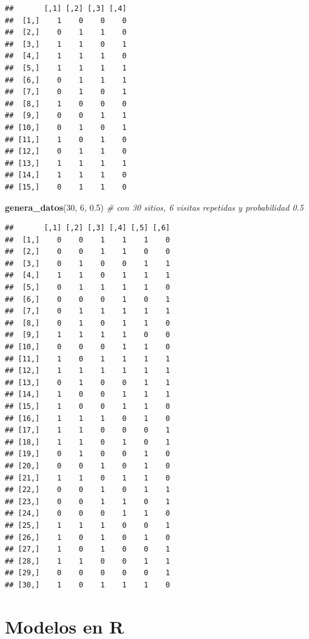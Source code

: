 \documentclass[
]{book}
\newenvironment{Shaded}{\begin{snugshade}}{\end{snugshade}}
\newcommand{\CommentTok}[1]{\textcolor[rgb]{0.56,0.35,0.01}{\textit{#1}}}
\newcommand{\DecValTok}[1]{\textcolor[rgb]{0.00,0.00,0.81}{#1}}
\newcommand{\FloatTok}[1]{\textcolor[rgb]{0.00,0.00,0.81}{#1}}
\newcommand{\KeywordTok}[1]{\textcolor[rgb]{0.13,0.29,0.53}{\textbf{#1}}}
\newcommand{\NormalTok}[1]{#1}
\begin{document}
\begin{verbatim}
##       [,1] [,2] [,3] [,4]
##  [1,]    1    0    0    0
##  [2,]    0    1    1    0
##  [3,]    1    1    0    1
##  [4,]    1    1    1    0
##  [5,]    1    1    1    1
##  [6,]    0    1    1    1
##  [7,]    0    1    0    1
##  [8,]    1    0    0    0
##  [9,]    0    0    1    1
## [10,]    0    1    0    1
## [11,]    1    0    1    0
## [12,]    0    1    1    0
## [13,]    1    1    1    1
## [14,]    1    1    1    0
## [15,]    0    1    1    0
\end{verbatim}

\begin{Shaded}
\begin{Highlighting}[]
\KeywordTok{genera_datos}\NormalTok{(}\DecValTok{30}\NormalTok{, }\DecValTok{6}\NormalTok{, }\FloatTok{0.5}\NormalTok{) }\CommentTok{# con 30 sitios, 6 visitas repetidas y probabilidad 0.5}
\end{Highlighting}
\end{Shaded}

\begin{verbatim}
##       [,1] [,2] [,3] [,4] [,5] [,6]
##  [1,]    0    0    1    1    1    0
##  [2,]    0    0    1    1    0    0
##  [3,]    0    1    0    0    1    1
##  [4,]    1    1    0    1    1    1
##  [5,]    0    1    1    1    1    0
##  [6,]    0    0    0    1    0    1
##  [7,]    0    1    1    1    1    1
##  [8,]    0    1    0    1    1    0
##  [9,]    1    1    1    1    0    0
## [10,]    0    0    0    1    1    0
## [11,]    1    0    1    1    1    1
## [12,]    1    1    1    1    1    1
## [13,]    0    1    0    0    1    1
## [14,]    1    0    0    1    1    1
## [15,]    1    0    0    1    1    0
## [16,]    1    1    1    0    1    0
## [17,]    1    1    0    0    0    1
## [18,]    1    1    0    1    0    1
## [19,]    0    1    0    0    1    0
## [20,]    0    0    1    0    1    0
## [21,]    1    1    0    1    1    0
## [22,]    0    0    1    0    1    1
## [23,]    0    0    1    1    0    1
## [24,]    0    0    0    1    1    0
## [25,]    1    1    1    0    0    1
## [26,]    1    0    1    0    1    0
## [27,]    1    0    1    0    0    1
## [28,]    1    1    0    0    1    1
## [29,]    0    0    0    0    0    1
## [30,]    1    0    1    1    1    0
\end{verbatim}

\hypertarget{modelos-en-r}{%
\chapter{Modelos en R}\label{modelos-en-r}}
\end{document}
